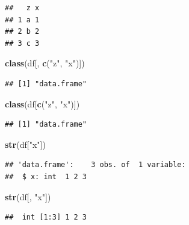 \documentclass[]{article}
\newenvironment{Shaded}{\begin{snugshade}}{\end{snugshade}}
\newcommand{\KeywordTok}[1]{\textcolor[rgb]{0.13,0.29,0.53}{\textbf{{#1}}}}
\newcommand{\StringTok}[1]{\textcolor[rgb]{0.31,0.60,0.02}{{#1}}}
\newcommand{\NormalTok}[1]{{#1}}
\begin{document}
\begin{verbatim}
##   z x
## 1 a 1
## 2 b 2
## 3 c 3
\end{verbatim}

\begin{Shaded}
\begin{Highlighting}[]
\KeywordTok{class}\NormalTok{(df[, }\KeywordTok{c}\NormalTok{(}\StringTok{"z"}\NormalTok{, }\StringTok{"x"}\NormalTok{)])}
\end{Highlighting}
\end{Shaded}

\begin{verbatim}
## [1] "data.frame"
\end{verbatim}

\begin{Shaded}
\begin{Highlighting}[]
\KeywordTok{class}\NormalTok{(df[}\KeywordTok{c}\NormalTok{(}\StringTok{"z"}\NormalTok{, }\StringTok{"x"}\NormalTok{)])}
\end{Highlighting}
\end{Shaded}

\begin{verbatim}
## [1] "data.frame"
\end{verbatim}

\begin{Shaded}
\begin{Highlighting}[]
\KeywordTok{str}\NormalTok{(df[}\StringTok{"x"}\NormalTok{])}
\end{Highlighting}
\end{Shaded}

\begin{verbatim}
## 'data.frame':    3 obs. of  1 variable:
##  $ x: int  1 2 3
\end{verbatim}

\begin{Shaded}
\begin{Highlighting}[]
\KeywordTok{str}\NormalTok{(df[, }\StringTok{"x"}\NormalTok{])}
\end{Highlighting}
\end{Shaded}

\begin{verbatim}
##  int [1:3] 1 2 3
\end{verbatim}

\begin{Shaded}
\end{Shaded}
\end{document}
